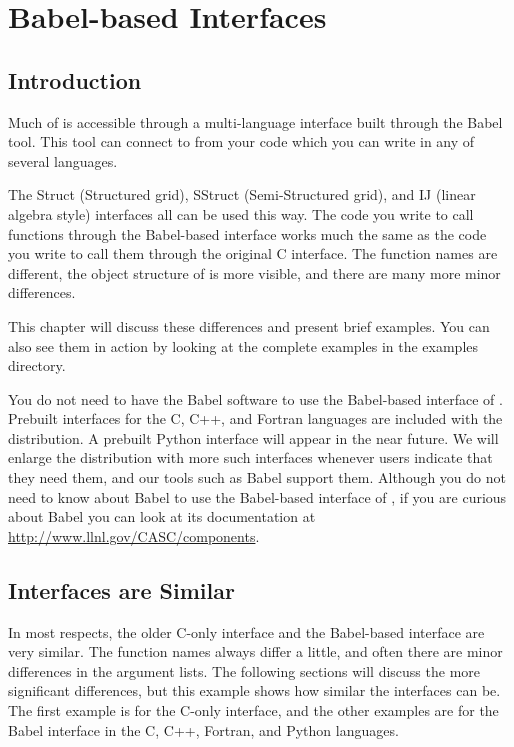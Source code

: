 
\chapter{Babel-based Interfaces}
\label{ch-babel}

\section{Introduction}

Much of \hypre{} is accessible through a multi-language interface
built through the Babel tool.  This tool can connect to \hypre{} from
your code which you can write in any of several languages.

The Struct (Structured grid), SStruct (Semi-Structured grid), and IJ
(linear algebra style) interfaces all can be used
this way.  The code you write to call \hypre{} functions through the
Babel-based interface works much the same as the code you write to
call them through the original C interface.  The function names are
different, the object structure of \hypre{} is more visible, and there
are many more minor differences.

This chapter will discuss these differences and present brief
examples.  You can also see them in action by looking at the complete
examples in the examples directory.

You do not need to have the Babel software to use the Babel-based
interface of \hypre{}.  Prebuilt interfaces for the C, C++, and
Fortran languages are included with the \hypre{} distribution.  A
prebuilt Python interface will appear in the near future.  We will
enlarge the distribution with more such interfaces whenever \hypre{}
users indicate that they need them, and our tools such as Babel
support them.  Although you do not need to know about Babel to use the
Babel-based interface of \hypre{}, if you are curious about Babel you
can look at its documentation at
\url{http://www.llnl.gov/CASC/components}.

\section{Interfaces are Similar}
\label{sec-Interfaces-Similar}

In most respects, the older C-only interface and the Babel-based
interface are very similar. The function names always differ a little,
and often there are minor differences in the argument lists.  The
following sections will discuss the more significant differences, but
this example shows how similar the interfaces can be.  The first
example is for the C-only interface, and the other examples are for
the Babel interface in the C, C++, Fortran, and Python languages.

